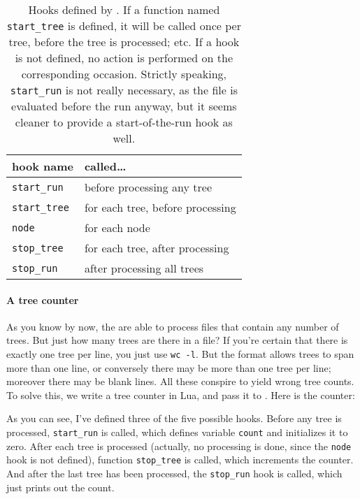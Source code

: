 \begin{table}
	\centering
	\begin{tabular}{ll}
		hook name & called\ldots \\
		\hline
		\texttt{start\_run} 	& before processing any tree \\
		\texttt{start\_tree}	& for each tree, before processing \\
		\texttt{node}					& for each node \\
		\texttt{stop\_tree}		& for each tree, after processing \\
		\texttt{stop\_run}			& after processing all trees
	\end{tabular}
	\caption{%
		\label{tbl:luaedHooks}
		Hooks defined by \luaed. If a function named \texttt{start\_tree} is
		defined, it will be called once per tree, before the tree is processed; etc.
		If a hook is not defined, no action is performed on the corresponding
		occasion. Strictly speaking, \texttt{start\_run} is not really necessary, as
		the file is evaluated before the run anyway, but it seems cleaner to provide
		a start-of-the-run hook as well.
	}
\end{table}

\paragraph{A tree counter}

As you know by now, the \nutils{} are able to process files that contain any
number of trees. But just how many trees are there in a file? If you're certain
that there is exactly one tree per line, you just use \texttt{wc -l}. But the
\nw{} format allows trees to span more than one line, or conversely there may be
more than one tree per line; moreover there may be blank lines. All these
conspire to yield wrong tree counts. To solve this, we write a tree counter in
Lua, and pass it to \luaed. Here is the counter:

\begin{samepage}


\end{samepage}

As you can see, I've defined three of the five possible hooks. Before any tree
is processed, \texttt{start\_run} is called, which defines variable
\texttt{count} and initializes it to zero. After each tree is processed
(actually, no processing is done, since the \texttt{node} hook is not defined),
function \texttt{stop\_tree} is called, which increments the counter. And after
the last tree has been processed, the \texttt{stop\_run} hook is called, which
just prints out the count.

